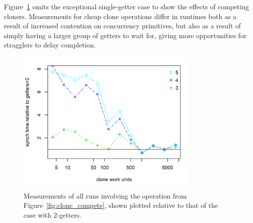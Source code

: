 Figure~\ref{fig:clone_compete_2} omits the exceptional single-getter case to show the effects of competing cloners. Measurements for cheap clone operations differ in runtimes both as a result of increased contention on concurrency primitives, but also as a result of simply having a larger group of getters to wait for, giving more opportunities for stragglers to delay completion. 


\begin{figure}
	\centering
	\includegraphics[width=0.80\textwidth]{experiments/clone_compete_2.png}
	\caption[Duration of interaction in siso connector with clonable data plotted relative to the speed of the 2-getter case.]{Measurements of all runs involving the  operation from Figure~\ref{fig:clone_compete}, shown plotted relative to that of the case with 2-getters.}
	\label{fig:clone_compete_2}
\end{figure}

